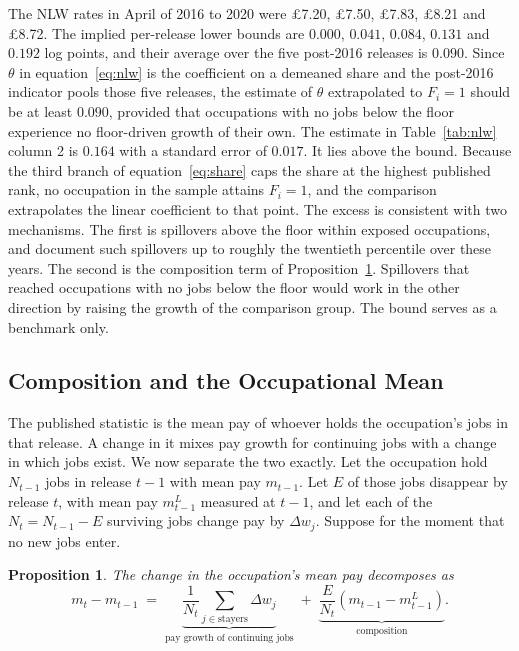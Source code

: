 \documentclass[12pt,leqno]{article}
\newtheorem{proposition}{Proposition}
\begin{document}
The NLW rates in April of 2016 to 2020 were \pounds 7.20, \pounds 7.50, \pounds 7.83, \pounds 8.21 and \pounds 8.72. The implied per-release lower bounds are $0.000$, $0.041$, $0.084$, $0.131$ and $0.192$ log points, and their average over the five post-2016 releases is $0.090$. Since $\theta$ in equation~\eqref{eq:nlw} is the coefficient on a demeaned share and the post-2016 indicator pools those five releases, the estimate of $\theta$ extrapolated to $F_i = 1$ should be at least $0.090$, provided that occupations with no jobs below the floor experience no floor-driven growth of their own. The estimate in Table~\ref{tab:nlw} column 2 is $0.164$ with a standard error of $0.017$. It lies above the bound. Because the third branch of equation~\eqref{eq:share} caps the share at the highest published rank, no occupation in the sample attains $F_i = 1$, and the comparison extrapolates the linear coefficient to that point. The excess is consistent with two mechanisms. The first is spillovers above the floor within exposed occupations, and \citet{giupponi2024minimum} document such spillovers up to roughly the twentieth percentile over these years. The second is the composition term of Proposition~\ref{prop:composition}. Spillovers that reached occupations with no jobs below the floor would work in the other direction by raising the growth of the comparison group. The bound serves as a benchmark only.

\subsection{Composition and the Occupational Mean}

The published statistic is the mean pay of whoever holds the occupation's jobs in that release. A change in it mixes pay growth for continuing jobs with a change in which jobs exist. We now separate the two exactly. Let the occupation hold $N_{t-1}$ jobs in release $t-1$ with mean pay $m_{t-1}$. Let $E$ of those jobs disappear by release $t$, with mean pay $m^{L}_{t-1}$ measured at $t-1$, and let each of the $N_t = N_{t-1} - E$ surviving jobs change pay by $\Delta w_j$. Suppose for the moment that no new jobs enter.

\begin{proposition}\label{prop:composition}
The change in the occupation's mean pay decomposes as
\begin{equation}\label{eq:decomp}
m_t - m_{t-1} \;=\; \underbrace{\frac{1}{N_t}\sum_{j \in \mathrm{stayers}} \Delta w_j}_{\text{pay growth of continuing jobs}} \;+\; \underbrace{\frac{E}{N_t}\left(m_{t-1} - m^{L}_{t-1}\right)}_{\text{composition}} .
\end{equation}
\end{proposition}
\end{document}
